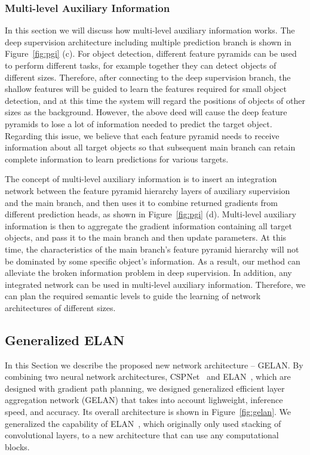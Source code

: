 \documentclass[10pt,twocolumn,letterpaper]{article}
\begin{document}
	\vspace{-12pt}
	
	\subsubsection{Multi-level Auxiliary Information}
	
	In this section we will discuss how multi-level auxiliary information works.  The deep supervision architecture including multiple prediction branch is shown in Figure~\ref{fig:pgi} (c).  For object detection, different feature pyramids can be used to perform different tasks, for example together they can detect objects of different sizes.  Therefore, after connecting to the deep supervision branch, the shallow features will be guided to learn the features required for small object detection, and at this time the system will regard the positions of objects of other sizes as the background.  However, the above deed will cause the deep feature pyramids to lose a lot of information needed to predict the target object. Regarding this issue, we believe that each feature pyramid needs to receive information about all target objects so that subsequent main branch can retain complete information to learn predictions for various targets.	
	
	The concept of multi-level auxiliary information is to insert an integration network between the feature pyramid hierarchy layers of auxiliary supervision and the main branch, and then uses it to combine returned gradients from different prediction heads, as shown in Figure~\ref{fig:pgi} (d).  Multi-level auxiliary information is then to aggregate the gradient information containing all target objects, and pass it to the main branch and then update parameters.  At this time, the characteristics of the main branch's feature pyramid hierarchy will not be dominated by some specific object's information.  As a result, our method can alleviate the broken information problem in deep supervision.  In addition, any integrated network can be used in multi-level auxiliary information.  Therefore, we can plan the required semantic levels to guide the learning of network architectures of different sizes. 
	
	\subsection{Generalized ELAN}
	
	In this Section we describe the proposed new network architecture -- GELAN. By combining two neural network architectures, CSPNet~\cite{wang2020cspnet} and ELAN~\cite{wang2023designing}, which are designed with gradient path planning, we designed generalized efficient layer aggregation network (GELAN) that takes into account lighweight, inference speed, and accuracy. Its overall architecture is shown in Figure~\ref{fig:gelan}. We generalized the capability of ELAN~\cite{wang2023designing}, which originally only used stacking of convolutional layers, to a new architecture that can use any computational blocks.
	
\end{document}
